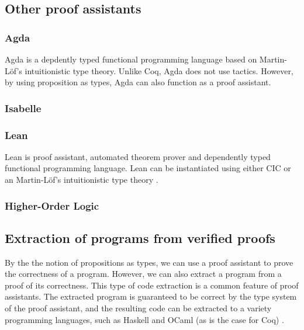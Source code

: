 \subsection{Other proof assistants}
\label{ssec:other_proof_assistants}

\subsubsection{Agda}
\label{sssec:agda}

Agda is a depdently typed functional programming language based on Martin-Löf's
intuitionistic type theory. Unlike Coq, Agda does not use tactics. \cite{agdatut}
However, by using proposition as types, Agda can also function as a proof assistant.

\subsubsection{Isabelle}
\label{sssec:isabelle}

\subsubsection{Lean}
\label{sssec:lean}

Lean is proof assistant, automated theorem prover and dependently typed functional programming language.
Lean can be instantiated using either CIC or an Martin-Löf's intuitionistic type theory
\cite{lean}.

\subsubsection{Higher-Order Logic}
\label{sssec:hol}

\subsection{Extraction of programs from verified proofs}
\label{ssec:extraction_of_programs_from_verified_proofs}

By the the notion of propositions as types, we can use a proof assistant to
prove the correctness of a program. However, we can also extract a program from
a proof of its correctness. This type of code extraction is a common feature of proof assistants.
The extracted program is guaranteed to be correct by the type system of the proof assistant,
and the resulting code can be extracted to a variety programming languages, such as Haskell and OCaml (as is the case for Coq) \cite{cintro}.
